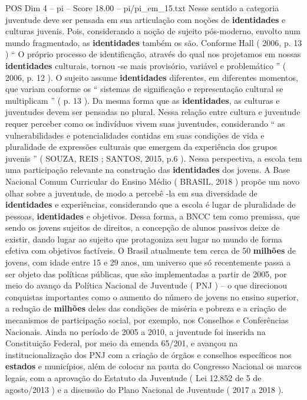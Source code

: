 \begin{textsample}{POS Dim 4 – pi – Score 18.00 – pi/pi\_em\_15.txt}
Nesse sentido a categoria juventude deve ser pensada em sua articulação com noções de \textbf{identidades} e culturas juvenis.
Pois, considerando a noção de sujeito pós-moderno, envolto num mundo fragmentado, as \textbf{identidades} também os são.
Conforme Hall ( 2006, p. 13 ) “ O próprio processo de identificação, através do qual nos projetamos em nossas \textbf{identidades} culturais, tornou -se mais provisório, variável e problemático ” ( 2006, p. 12 ).
O sujeito assume \textbf{identidades} diferentes, em diferentes momentos, que variam conforme os “ sistemas de significação e representação cultural se multiplicam ” ( p. 13 ).
Da mesma forma que as \textbf{identidades}, as culturas e juventudes devem ser pensadas no plural.
Nessa relação entre cultura e juventude requer perceber como os indivíduos vivem suas juventudes, considerando “ as vulnerabilidades e potencialidades contidas em suas condições de vida e pluralidade de expressões culturais que emergem da experiência dos grupos juvenis ” ( SOUZA, REIS ; SANTOS, 2015, p.6 ).
Nessa perspectiva, a escola tem uma participação relevante na construção das \textbf{identidades} dos jovens.
A Base Nacional Comum Curricular do Ensino Médio ( BRASIL, 2018 ) propõe um novo olhar sobre a juventude, de modo a percebê -la em sua diversidade de \textbf{identidades} e experiências, considerando que a escola é lugar de pluralidade de pessoas, \textbf{identidades} e objetivos.
Dessa forma, a BNCC tem como premissa, que sendo os jovens sujeitos de direitos, a concepção de alunos passivos deixe de existir, dando lugar ao sujeito que protagoniza seu lugar no mundo de forma efetiva com objetivos factíveis.
O Brasil atualmente tem cerca de 50 \textbf{milhões} de jovens, com idade entre 15 e 29 anos, um universo que só recentemente passa a ser objeto das políticas públicas, que são implementadas a partir de 2005, por meio do avanço da Política Nacional de Juventude ( PNJ ) – o que direcionou conquistas importantes como o aumento do número de jovens no ensino superior, a redução de \textbf{milhões} deles das condições de miséria e pobreza e a criação de mecanismos de participação social, por exemplo, nos Conselhos e Conferências Nacionais.
Ainda no período de 2005 a 2010, a juventude foi inserida na Constituição Federal, por meio da emenda 65/201, e avançou na institucionalização dos PNJ com a criação de órgãos e conselhos específicos nos \textbf{estados} e municípios, além de colocar na pauta do Congresso Nacional os marcos legais, com a aprovação do Estatuto da Juventude ( Lei 12.852 de 5 de agosto/2013 ) e a discussão do Plano Nacional de Juventude ( 2017 a 2018 ).

\end{textsample}
